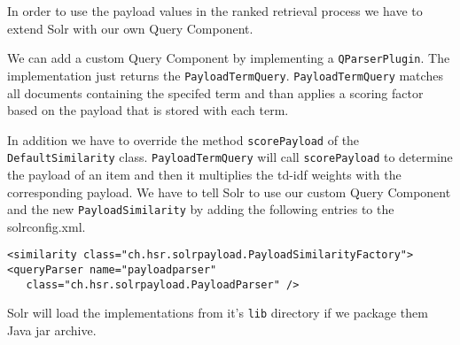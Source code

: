 In order to use the payload values in the ranked retrieval process we have to extend Solr with our own Query Component. 

We can add a custom Query Component by implementing a \verb|QParserPlugin|. The implementation just returns the \verb|PayloadTermQuery|. \verb|PayloadTermQuery| matches all documents containing the specifed term and than applies a scoring factor based on the payload that is stored with each term.

In addition we have to override the method \verb|scorePayload| of the \\ \verb|DefaultSimilarity| class. \verb|PayloadTermQuery| will call \verb|scorePayload| to determine the payload of an item and then it multiplies the td-idf weights with the corresponding payload. We have to tell Solr to use our custom Query Component and the new \verb|PayloadSimilarity| by adding the following entries to the solrconfig.xml.

\begin{lstlisting}
<similarity class="ch.hsr.solrpayload.PayloadSimilarityFactory">
<queryParser name="payloadparser" 
   class="ch.hsr.solrpayload.PayloadParser" />
\end{lstlisting}
  
Solr will load the implementations from it's \verb|lib| directory if we package them Java jar archive.
